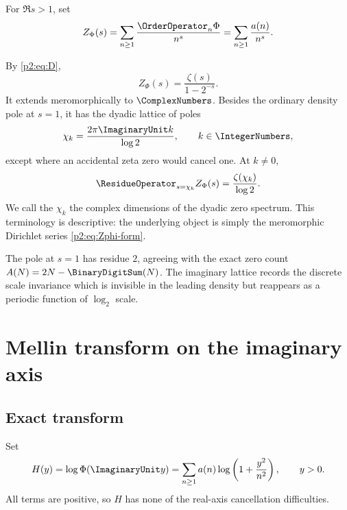 \documentclass[11pt]{article}
\numberwithin{equation}{section}
\theoremstyle{definition}
\theoremstyle{remark}
\begin{document}
\begin{definition}
For $\Re s>1$, set
\begin{equation}
 Z_\Phi(s)=\sum_{n\ge1}\frac{\OrderOperator_n\Phi}{n^s}
          =\sum_{n\ge1}\frac{a(n)}{n^s}.                  \label{p2:eq:Zphi}
\end{equation}
\end{definition}
By \eqref{p2:eq:D},
\begin{equation}
 Z_\Phi(s)=\frac{\zeta(s)}{1-2^{-s}}.                     \label{p2:eq:Zphi-form}
\end{equation}
It extends meromorphically to $\ComplexNumbers$.  Besides the ordinary density pole at $s=1$,
it has the dyadic lattice of poles
\begin{equation}
 \chi_k=\frac{2\pi\ImaginaryUnit k}{\log2},\qquad k\in\IntegerNumbers,            \label{p2:eq:chi}
\end{equation}
except where an accidental zeta zero would cancel one.  At $k\ne0$,
\begin{equation}
 \ResidueOperator_{s=\chi_k}Z_\Phi(s)=\frac{\zeta(\chi_k)}{\log2}.    \label{p2:eq:resZ}
\end{equation}
We call the $\chi_k$ the complex dimensions of the dyadic zero spectrum.  This
terminology is descriptive: the underlying object is simply the meromorphic
Dirichlet series \eqref{p2:eq:Zphi-form}.

\begin{remark}
The pole at $s=1$ has residue $2$, agreeing with the exact zero count
$A(N)=2N-\BinaryDigitSum(N)$.  The imaginary lattice records the discrete scale invariance
which is invisible in the leading density but reappears as a periodic function
of $\log_2$ scale.
\end{remark}

\section{Mellin transform on the imaginary axis}
\label{p2:sec:mellin}

\subsection{Exact transform}

Set
\begin{equation}
 H(y)=\log\Phi(\ImaginaryUnit y)
     =\sum_{n\ge1}a(n)\log\left(1+\frac{y^2}{n^2}\right),
 \qquad y>0.                                               \label{p2:eq:H}
\end{equation}
All terms are positive, so $H$ has none of the real-axis cancellation difficulties.
\end{document}
